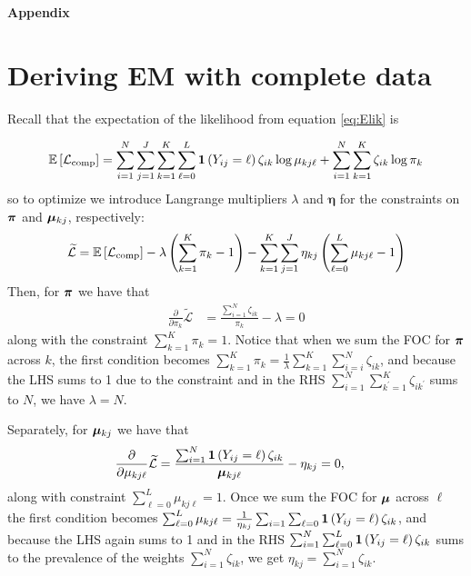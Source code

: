 \documentclass[11pt]{article}
\begin{document}
\newpage
\begin{appendices}
\appendix

\begin{centering}
\textbf{\large{Appendix}}
\end{centering}

\section{Deriving EM with complete data \label{sec:EM-deriv_nomissing}}

Recall that the expectation of the likelihood from equation \ref{eq:Elik} is

\begin{align*}
\mathbb{E}\left[\mathcal{L}_{\text{comp}}\right] = \sum^{N}_{i=1}\sum^{J}_{j=1}\sum^{K}_{k=1}\sum^{L}_{\ell = 0}\bm{1}\left(Y_{ij} = \ell\right) \zeta_{ik}\log\mu_{kj\ell} +
\sum^{N}_{i=1}\sum^{K}_{k=1}\zeta_{ik}\log \pi_{k}
\end{align*}
so to optimize we introduce Langrange multipliers \(\lambda\) and \(\bm{\eta}\) for the constraints on \(\bm{\pi}\) and \(\bm{\mu}_{kj}\), respectively:
\begin{align}
\widetilde{\mathcal{L}} = \mathbb{E}\left[\mathcal{L}_\text{comp}\right] - \lambda\left(\sum^{K}_{k=1}\pi_k - 1\right) - \sum^{K}_{k=1}\sum^{J}_{j=1}\eta_{kj}\left(\sum^{L}_{\ell=0}\mu_{kj\ell} - 1\right)\label{eq:lagrange_a}
\end{align}
Then, for \(\bm{\pi}\) we have that
\begin{align*}
\frac{\partial}{\partial {\pi}_{k}}\widetilde{\mathcal{L}}
&= \frac{\sum^{N}_{i=1}\zeta_{ik}}{{\pi}_{k}} - \lambda  = 0
\end{align*}
along with the constraint \(\sum^K_{k=1}\pi_k = 1\). Notice that when we sum the FOC for \(\bm{\pi}\) across \(k\), the first condition becomes \(\sum^K_{k=1}\pi_k = \frac{1}{\lambda}\sum^K_{k = 1}\sum^N_{i=i}\zeta_{ik}\), and because the LHS sums to 1 due to the constraint and in the RHS  \(\sum^{N}_{i=1}\sum^{K}_{k^\prime =1}\zeta_{ik^\prime}\) sums to \(N\), we have \(\lambda = N\).

\medskip

Separately, for \(\bm{\mu}_{kj}\) we have that
\begin{align*}
\frac{\partial}{\partial {\mu}_{kj\ell}}\widetilde{\mathcal{L}}
&= \frac{\sum^{N}_{i=1}\bm{1}\left(Y_{ij} = \ell\right)\zeta_{ik}}{\bm{\mu}_{kj\ell}} - \eta_{kj}  = 0,
\end{align*}
along with constraint \(\sum^L_{\ell = 0} \mu_{kj\ell} = 1\). Once we sum the FOC for \(\bm{\mu}\) across \(\ell\) the first condition becomes  \(\sum^L_{\ell=0} \mu_{kj\ell} = \frac{1}{\eta_{kj}}\sum_{i=1}\sum_{\ell=0}\bm{1}\left(Y_{ij} = \ell\right)\zeta_{ik}\), and because the LHS again sums to 1 and in the RHS   \(\sum^{N}_{i=1}\sum^{L}_{\ell = 0}\bm{1}\left(Y_{ij} = \ell\right)\zeta_{ik}\) sums to the prevalence of the weights \(\sum^{N}_{i=1}\zeta_{ik}\), we get \(\eta_{kj}= \sum^{N}_{i=1}\zeta_{ik}\).
\medskip


\end{appendices}
\end{document}
